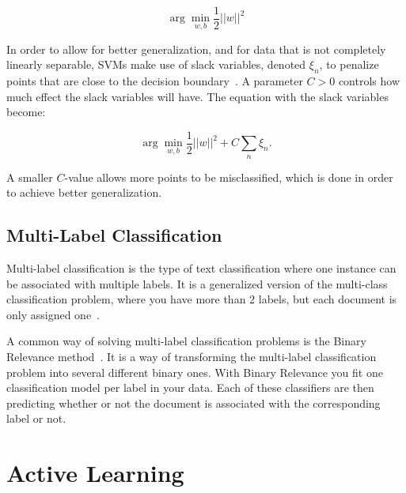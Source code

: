\begin{equation}
    \arg\min_{w,b}\frac{1}{2}||w||^2
\end{equation}

In order to allow for better generalization, and for data that is not completely linearly separable, SVMs make use of slack variables, denoted $\xi_n$, to penalize points that are close to the decision boundary~\cite{bishop2006pattern}.
A parameter $C>0$ controls how much effect the slack variables will have.
The equation with the slack variables become:

\begin{equation}
    \arg\min_{w,b}\frac{1}{2}||w||^2 + C \sum_n\xi_n.
\end{equation}

A smaller $C$-value allows more points to be misclassified, which is done in order to achieve better generalization.

\subsection{Multi-Label Classification}\label{subsec:multi-label-classification}

Multi-label classification is the type of text classification where one instance can be associated with multiple labels.
It is a generalized version of the multi-class classification problem, where you have more than 2 labels, but each document is only assigned one~\cite{tsoumakas2006multi}.

A common way of solving multi-label classification problems is the Binary Relevance method~\cite{read2011classifier, boutell2004learning, luaces2012binary}.
It is a way of transforming the multi-label classification problem into several different binary ones.
With Binary Relevance you fit one classification model per label in your data.
Each of these classifiers are then predicting whether or not the document is associated with the corresponding label or not.

\section{Active Learning}\label{sec:active-learning}

